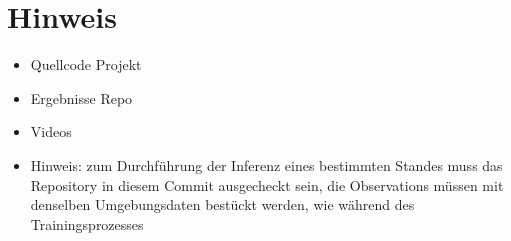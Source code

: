 \chapter{Hinweis}
\begin{itemize}
    \item Quellcode Projekt
    \item Ergebnisse Repo
    \item Videos
    \item Hinweis: zum Durchführung der Inferenz eines bestimmten Standes muss das Repository in diesem Commit ausgecheckt sein, die Observations müssen mit denselben Umgebungsdaten bestückt werden, wie während des Trainingsprozesses
\end{itemize}